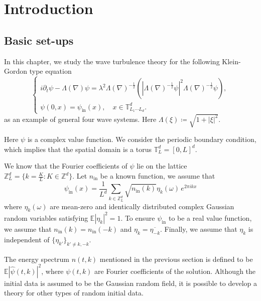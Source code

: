 \section{Introduction}


\subsection{Basic set-ups}

In this chapter, we study the wave turbulence theory for the following Klein-Gordon type equation
\begin{equation}\tag{NKLG}\label{eq.NKLG}
 \begin{cases}
 i\partial_t\psi-\Lambda(\nabla)\psi=\lambda^2 \Lambda(\nabla)^{-\frac{1}{2}}\left(|\Lambda(\nabla)^{-\frac{1}{2}}\psi|^2\Lambda(\nabla)^{-\frac{1}{2}}\psi\right),\\[.6em]
 \psi(0,x) = \psi_{\textrm{in}}(x), \quad x\in \mathbb{T}^d_{L_1\cdots L_d}.
 \end{cases} 
\end{equation}
as an example of general four wave systems. Here $\Lambda(\xi)\coloneqq\sqrt{1+|\xi|^2}$.

Here $\psi$ is a complex value function. We consider the periodic boundary condition, which implies that the spatial domain is a torus $\mathbb{T}^d_{L}=[0, L]^d$. 

We know that the Fourier coefficients of $\psi$ lie on the lattice $\mathbb{Z}_L^d = \{k=\frac{K}{L}:K\in \mathbb{Z}^d\}$. Let $n_{\textrm{in}}$ be a known function, we assume that
\begin{equation}\label{eq.wellprepared}
\psi_{\textrm{in}}(x)=\frac{1}{L^d}\sum_{k\in\mathbb{Z}^d_L}\sqrt{n_{\textrm{in}}(k)} \eta_k(\omega)\, e^{2\pi i kx}
\end{equation}
where $\eta_k(\omega)$ are mean-zero and identically distributed complex Gaussian random variables satisfying $\mathbb E |\eta_k|^2=1$. To ensure $\psi_{\textrm{in}}$ to be a real value function, we assume that $n_{\textrm{in}}(k)=n_{\textrm{in}}(-k)$ and $\eta_k=\overline{\eta_{-k}}$. Finally, we assume that $\eta_k$ is independent of $\{\eta_{k'}\}_{k'\ne k,-k}$.

The energy spectrum $n(t,k)$ mentioned in the previous section is defined to be $\mathbb E |\widehat \psi(t, k)|^2$, where $\psi(t, k)$ are Fourier coefficients of the solution. Although the initial data is assumed to be the Gaussian random field, it is possible to develop a theory for other types of random initial data.

